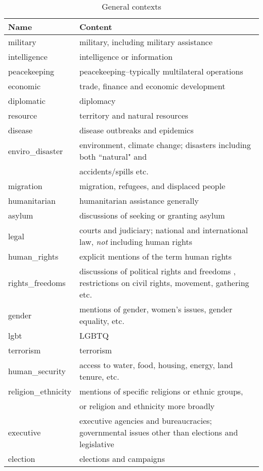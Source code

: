 \documentclass[11pt]{report}
\begin{document}
\begin{table}[htp]
\caption{General contexts }
\begin{center}
\begin{tabular}{|l|l|}
\hline
Name & Content \\
\hline
military & military, including military assistance \\
intelligence & intelligence or information \\
peacekeeping & peacekeeping–typically multilateral operations \\
economic & trade, finance and economic development \\
diplomatic & diplomacy \\
resource & territory and natural resources \\
disease & disease outbreaks and epidemics \\
enviro\_disaster & environment, climate change; disasters including both ``natural" and \\&\hspace{6pt} accidents/spills etc.\\
migration  & migration, refugees, and displaced people \\
humanitarian & humanitarian assistance generally \\
asylum & discussions of seeking or granting asylum \\
legal & courts and judiciary; national and international law, \emph{not} including human rights \\ 
human\_rights & explicit mentions of the term human rights \\ 
rights\_freedoms & discussions of political rights and freedoms , restrictions on civil rights, movement, gathering etc.\\
gender & mentions of gender, women's issues, gender equality, etc. \\
lgbt & LGBTQ \\
terrorism & terrorism \\
human\_security & access to water, food, housing, energy, land tenure, etc. \\
religion\_ethnicity & mentions of specific religions or ethnic groups,  \\&\hspace{6pt} or religion and ethnicity more broadly \\
executive & executive agencies and bureaucracies; governmental issues other than elections and legislative \\
election & elections and campaigns \\

\end{tabular}
\end{center}
\end{table}
\end{document}
